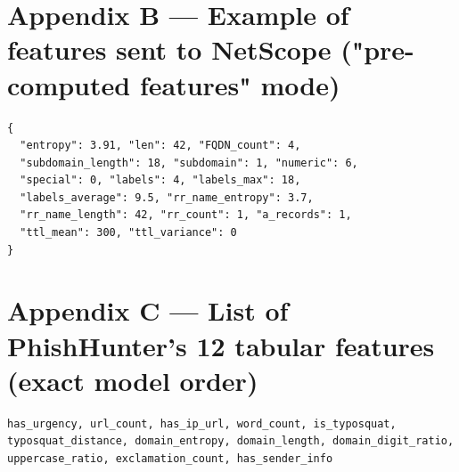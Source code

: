 \documentclass[12pt,a4paper]{report}
\begin{document}
\section*{Appendix B --- Example of features sent to NetScope ("pre-computed features" mode)}
\begingroup\small
\begin{verbatim}
{
  "entropy": 3.91, "len": 42, "FQDN_count": 4,
  "subdomain_length": 18, "subdomain": 1, "numeric": 6,
  "special": 0, "labels": 4, "labels_max": 18,
  "labels_average": 9.5, "rr_name_entropy": 3.7,
  "rr_name_length": 42, "rr_count": 1, "a_records": 1,
  "ttl_mean": 300, "ttl_variance": 0
}
\end{verbatim}
\endgroup

\section*{Appendix C --- List of PhishHunter's 12 tabular features (exact model order)}
\begingroup\small
\begin{verbatim}
has_urgency, url_count, has_ip_url, word_count, is_typosquat,
typosquat_distance, domain_entropy, domain_length, domain_digit_ratio,
uppercase_ratio, exclamation_count, has_sender_info
\end{verbatim}
\endgroup
\end{document}
